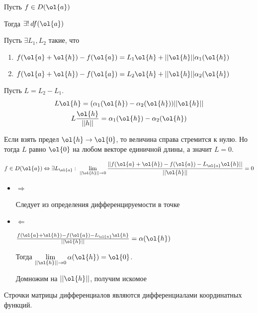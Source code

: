 \begin{prop}{}{}
    Пусть \( f \in D(\ol{a}) \)

    Тогда \( \exists! \: df(\ol{a}) \)
\end{prop}

Пусть \( \exists L_1, L_2 \) такие, что
\begin{enumerate}
    \item
        \( f(\ol{a} + \ol{h}) - f(\ol{a}) = L_1 \ol{h} + ||\ol{h} || \alpha_1 (\ol{h}) \)
    \item
        \( f(\ol{a} + \ol{h}) - f(\ol{a}) = L_2 \ol{h} + ||\ol{h} || \alpha_2 (\ol{h}) \)
\end{enumerate}

Пусть \( L = L_2 - L_1 \).
\begin{gather*}
    L \ol{h} = ( \alpha_1(\ol{h}) -\alpha_2(\ol{h}) ) || \ol{h} ||
    \\
    L \frac{\ol{h}}{||h||} = \alpha_1(\ol{h}) -\alpha_2(\ol{h})
\end{gather*}

Если взять предел \( \ol{h} \to \ol{0} \),
то величина справа стремится к нулю.
Но тогда \( L \) равно \( \ol{0} \) на любом векторе единичной длины,
а значит \( L = 0 \).

\begin{prop}{}{}
    \[
        f \in D(\ol{a})
        \Leftrightarrow
        \exists L_{\ol{a}} : \ \lim\limits_{|| \ol{h} || \to 0} \frac{||f(\ol{a} + \ol{h}) - f(\ol{a}) - L_{\ol{a}} \ol{h}||}{||\ol{h}||} = 0
    \]
\end{prop}

\begin{itemize}
    \item
        \( \Rightarrow \)

        Следует из определения дифференцируемости в точке
    \item
        \( \Leftarrow \)

        \( \frac{f(\ol{a} + \ol{h}) - f(\ol{a}) - L_{\ol{a}} \ol{h}}{||\ol{h}||} = \alpha(\ol{h}) \)

        Тогда \( \lim\limits_{|| \ol{h} || \to 0} \alpha(\ol{h}) = \ol{0} \).

        Домножим на \( || \ol{h} || \), получим искомое
\end{itemize}

\begin{remark}{}{}
    Строчки матрицы дифференциалов являются дифференциалами координатных функций.
\end{remark}

